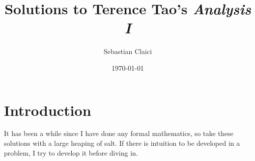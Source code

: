 \documentclass[12pt, letterpaper]{article}
\title{Solutions to Terence Tao's \emph{Analysis I}}
\author{Sebastian Claici}
\date{\today}
\begin{document}
\maketitle

\section*{Introduction}
It has been a while since I have done any formal mathematics, so take these solutions with a large heaping of salt. If there is intuition to be developed in a problem, I try to develop it before diving in.


\end{document}
